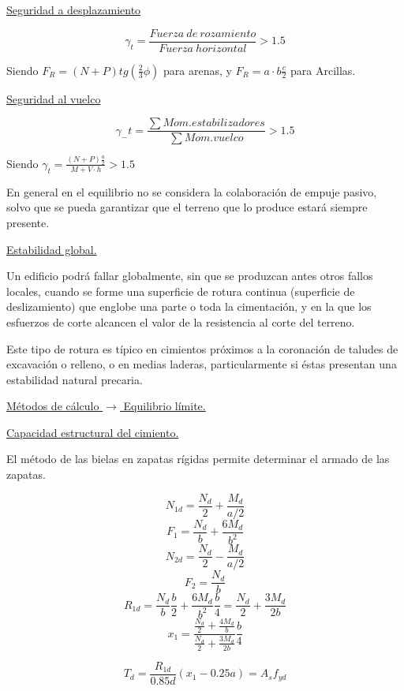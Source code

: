 \noindent \underline{Seguridad a desplazamiento}

\begin{equation}
    \gamma_t = \frac{Fuerza\ de\ rozamiento}{Fuerza\ horizontal} > 1.5
\end{equation}

Siendo $F_R = (N + P) tg(\frac{2}{3}\phi)$ para arenas, y $F_R = a \cdot b \frac{c}{2}$ para Arcillas.

\noindent \underline{Seguridad al vuelco}

\begin{equation}
     \gamma_-t = \frac{\sum Mom.estabilizadores}{\sum Mom.vuelco} > 1.5
\end{equation}

Siendo $\gamma_t = \frac{(N + P) \frac{a}{2}}{M + V \cdot h} > 1.5$

En general en el equilibrio no se considera la colaboración de empuje pasivo, solvo que se pueda garantizar que el terreno que lo produce estará siempre presente.


\noindent \underline{Estabilidad global.}

Un edificio podrá fallar globalmente, sin que se produzcan antes otros fallos locales, cuando se forme una superficie de rotura continua (superficie de deslizamiento) que englobe una parte o toda la cimentación, y en la que los esfuerzos de corte alcancen el valor de la resistencia al corte del terreno.

Este tipo de rotura es típico en cimientos próximos a la coronación de taludes de excavación o relleno, o en medias laderas, particularmente si éstas presentan una estabilidad natural precaria.

\noindent \underline{Métodos de cálculo $\rightarrow$ Equilibrio límite.}

\noindent \underline{Capacidad estructural del cimiento.}

El método de las bielas en zapatas rígidas permite determinar el armado de las zapatas.

\[N_{1d} = \frac{N_d}{2} + \frac{M_d}{a/2}\]
\[F_1 = \frac{N_d}{b} + \frac{6M_d}{b^2}\]
\[N_{2d} = \frac{N_d}{2} - \frac{M_d}{a/2}\]
\[F_2 = \frac{N_d}{b}\]
\[R_{1d} = \frac{N_d}{b} \frac{b}{2} + \frac{6M_d}{b^2} \frac{b}{4} = \frac{N_d}{2} + \frac{3M_d}{2b}\]
\[x_1 = \frac{\frac{N_d}{2} + \frac{4M_d}{b}}{\frac{N_d}{2} + \frac{3M_d}{2b}} \frac{b}{4}\]

\begin{equation}
    T_d = \frac{R_{1d}}{0.85d} (x_1 - 0.25a) = A_s f_{yd}
\end{equation}


